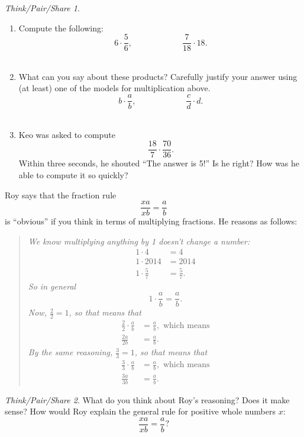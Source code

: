\documentclass[10pt, reqno]{amsart}
\theoremstyle{remark}
\newtheorem*{thinkpair*}{Think/Pair/Share}
\theoremstyle{definition}
\numberwithin{equation}{section}  %
\begin{document}
\begin{thinkpair*}\ 
\begin{enumerate}
\item
Compute the following:
\[
6 \cdot \frac 5 6,
\qquad\qquad\qquad
\frac{7}{18} \cdot 18.
\]\\

\item
What can you say about these products?  Carefully justify your answer using (at least) one of the models for multiplication above.
\[
b \cdot \frac a b,
\qquad\qquad\qquad
\frac cd \cdot d.
\]\\

\item
Keo was asked to compute
\[ 
\frac{18}7 \cdot \frac{70}{36}.
\]
Within three seconds, he shouted ``The answer is 5!''  Is he right?  How was he able to compute it so quickly?\\
\end{enumerate}
\end{thinkpair*}


Roy says that the fraction rule
\[
\frac{xa}{xb} = \frac ab
\]
is ``obvious'' if
you think in terms of multiplying fractions. He reasons as follows:

\begin{quotation}
\emph{
We know multiplying anything by 1 doesn't change a number:
\begin{align*}
1 \cdot 4 &= 4\\
1 \cdot 2014 &= 2014\\
1 \cdot \frac 5 7 &= \frac 5 7.
\end{align*}
So in general
\[
1 \cdot \frac a b = \frac a b.
\]
Now, $\frac 2 2 = 1$, so that means that 
\begin{align*}
\frac 2 2 \cdot \frac a b &= \frac a b, \text{ which means}\\
\frac{2a}{2b} &= \frac a b.
\end{align*}
By the same reasoning, $\frac 3 3  = 1$, so that means that 
\begin{align*}
\frac 3 3 \cdot \frac a b &= \frac a b, \text{ which means}\\
\frac{3a}{3b} &= \frac a b.
\end{align*}
}
\end{quotation}


\begin{thinkpair*}
What do you think about Roy's reasoning?  Does it make sense?
How would Roy explain the general rule for positive whole numbers $x$:
\[
\frac{xa}{xb} = \frac a b?
\]
\end{thinkpair*}
\end{document}
